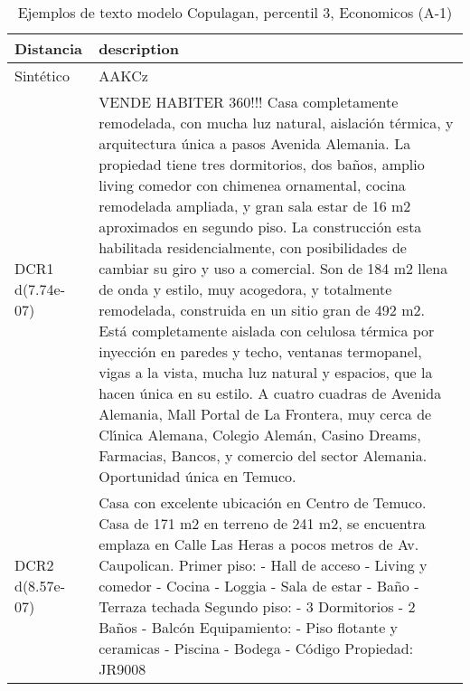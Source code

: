 \begin{table}[H]
\centering
\fontsize{10}{14}\selectfont
\caption{Ejemplos de texto modelo Copulagan, percentil 3, Economicos (A-1)}
\label{table-example-economicos-a-1-copulagan-3p-text}
\begin{tabular}{|l|m{35em}|}
\hline
\rowcolor[gray]{0.8}
Distancia & description \\
\hline Sintético & AAKCz \\
\hline DCR1 d(7.74e-07) & VENDE HABITER 360!!!  Casa completamente remodelada, con mucha luz natural, aislaci\'on t\'ermica, y arquitectura \'unica a pasos Avenida Alemania.  La propiedad tiene tres dormitorios, dos ba\~nos, amplio living comedor con chimenea ornamental, cocina remodelada ampliada, y gran sala estar de 16 m2 aproximados en segundo piso.  La construcci\'on esta habilitada residencialmente, con posibilidades de cambiar su giro y uso a comercial.  Son de 184 m2 llena de onda y estilo, muy acogedora, y totalmente remodelada, construida en un sitio gran de 492 m2.  Est\'a completamente aislada con celulosa t\'ermica por inyecci\'on en paredes y techo, ventanas termopanel, vigas a la vista, mucha luz natural y espacios, que la hacen \'unica en su estilo.  A cuatro cuadras de Avenida Alemania, Mall Portal de La Frontera, muy cerca de Cl{\'\i}nica Alemana, Colegio Alem\'an, Casino Dreams, Farmacias, Bancos, y comercio del sector Alemania.  Oportunidad \'unica en Temuco. \\
\hline DCR2 d(8.57e-07) & Casa con excelente ubicaci\'on en Centro de Temuco.  Casa de 171 m2 en terreno de 241 m2, se encuentra emplaza en Calle Las Heras a pocos metros de Av. Caupolican.  Primer piso: - Hall de acceso - Living y comedor - Cocina - Loggia - Sala de estar - Ba\~no - Terraza techada  Segundo piso: - 3 Dormitorios - 2 Ba\~nos - Balc\'on  Equipamiento: - Piso flotante y ceramicas - Piscina - Bodega - C\'odigo Propiedad: JR9008 \\
\hline
\end{tabular}
\end{table}
